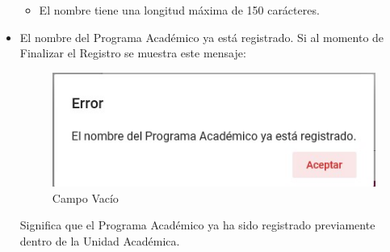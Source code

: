 \begin{itemize}
\begin{itemize}
                        \item El nombre tiene una longitud máxima de 150 carácteres.
                    \end{itemize}

                \item El nombre del Programa Académico ya está registrado.
                    Si al momento de Finalizar el Registro se muestra este mensaje:

                     \begin{figure}[H]
                    \centering
                    \hypertarget{vacio}{\includegraphics[width=0.7\linewidth]{images/SP3/Yareg}}
                    \caption{Campo Vacío}
                    \label{vacio}
                    \end{figure}

                    Significa que el Programa Académico ya ha sido registrado previamente dentro de la Unidad Académica.
            \end{itemize}
